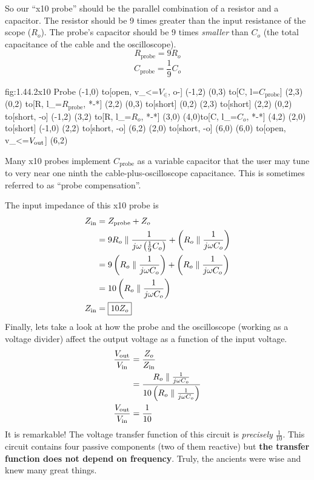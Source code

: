 So our ``x10 probe'' should be the parallel combination of a resistor and a capacitor.  The resistor should be 9 times greater than the input resistance of the scope ($R_o$).  The probe's capacitor should be 9 times \textit{smaller} than $C_o$ (the total capacitance of the cable and the oscilloscope).
\[R_{\text{probe}} = 9 R_o\]
\[C_{\text{probe}} = \frac{1}{9} C_o\]
\begin{circuit}{fig:1.44.2}{x10 Probe}
    (-1,0) to[open, v_<=$V_\in$, o-] (-1,2)
    (0,3) to[C, l=$C_{\text{probe}}$] (2,3)
    (0,2) to[R, l_=$R_{\text{probe}}$, *-*] (2,2)
    (0,3) to[short] (0,2)
    (2,3) to[short] (2,2)
    (0,2)  to[short, -o] (-1,2)
    (3,2) to[R, l_=$R_o$, *-*] (3,0)
    (4,0)to[C, l_=$C_o$, *-*] (4,2)
    (2,0) to[short] (-1,0)
    (2,2)  to[short, -o] (6,2)
    (2,0) to[short, -o] (6,0)
    (6,0) to[open, v_<=$V_{\text{out}}$] (6,2)
\end{circuit}
Many x10 probes implement $C_{\text{probe}}$ as a variable capacitor that the user may tune to very near one ninth the cable-plus-oscilloscope capacitance.  This is sometimes referred to as ``probe compensation''.

The input impedance of this x10 probe is
\begin{align*}
    Z_{\text{in}} &= Z_{\text{probe}} + Z_o \\
    &= 9 R_o \parallel \frac{1}{ j\omega \left( \frac{1}{9} C_o \right) } + \left( R_o \parallel \frac{1}{ j\omega C_o } \right) \\
    &= 9 \left( R_o \parallel \frac{1}{ j\omega C_o } \right) + \left( R_o \parallel \frac{1}{ j\omega C_o } \right) \\ 
    &= 10 \left( R_o \parallel \frac{1}{ j\omega C_o } \right) \\
    Z_{\text{in}} &= \boxed{ 10 Z_o }
\end{align*}
Finally, lets take a look at how the probe and the oscilloscope (working as a voltage divider) affect the output voltage as a function of the input voltage.
\begin{align*}
    \frac{V_{\text{out}}}{V_{\text{in}}} &= \frac{Z_o}{Z_{\text{in}}} \\
    &= \frac{ R_o \parallel \frac{1}{ j\omega C_o } }{ 10 \left( R_o \parallel \frac{1}{ j\omega C_o } \right) } \\
    \frac{V_{\text{out}}}{V_{\text{in}}} &= \frac{1}{10}
\end{align*}
It is remarkable! The voltage transfer function of this circuit is \textit{precisely} $\frac{1}{10}$.  This circuit contains four passive components (two of them reactive) but \textbf{the transfer function does not depend on frequency}. Truly, the ancients were wise and knew many great things.

